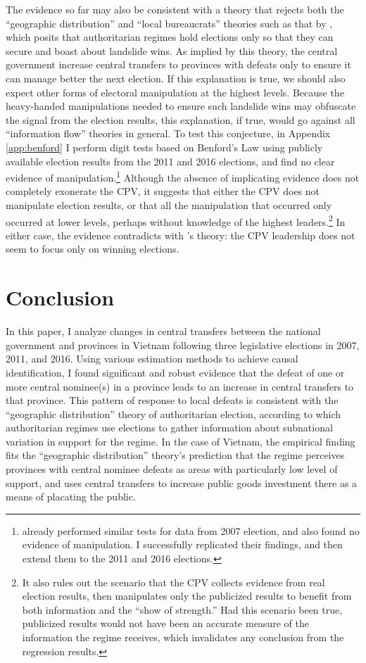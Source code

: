 \documentclass[12pt]{article}\usepackage[]{graphicx}\usepackage[]{color}
\newcommand{\1}{\mathbbm{1}}
\begin{document}
The evidence so far may also be consistent with a theory that rejects both the ``geographic distribution'' and ``local bureaucrats'' theories such as that by \cite{Geddes2005}, which posits that authoritarian regimes hold elections only so that they can secure and boast about landslide wins. As implied by this theory, the central government increase central transfers to provinces with defeats only to ensure it can manage better the next election. If this explanation is true, we should also expect other forms of electoral manipulation at the highest levels. Because the heavy-handed manipulations needed to ensure such landslide wins may obfuscate the signal from the election results, this explanation, if true, would go against all ``information flow'' theories in general.  To test this conjecture, in Appendix \ref{app:benford} I perform digit tests based on Benford's Law using publicly available election results from the 2011 and 2016 elections, and find no clear evidence of manipulation.\footnote{\cite{MaleskySchuler2011} already performed similar tests for data from 2007 election, and also found no evidence of manipulation. I successfully replicated their findings, and then extend them to the 2011 and 2016 elections.} Although the absence of implicating evidence does not completely exonerate the CPV, it suggests that either the CPV does not manipulate election results, or that all the manipulation that occurred only occurred at lower levels, perhaps without knowledge of the highest leaders.\footnote{It also rules out the scenario that the CPV collects evidence from real election results, then manipulates only the publicized results to benefit from both information and the ``show of strength.'' Had this scenario been true, publicized results would not have been an accurate measure of the information the regime receives, which invalidates any conclusion from the regression results.} In either case, the evidence contradicts with \cite{Geddes2005}'s theory: the CPV leadership does not seem to focus only on winning elections.

\section{Conclusion}
\label{sec:conclusion}

In this paper, I analyze changes in central transfers between the national government and provinces in Vietnam following three legislative elections in 2007, 2011, and 2016. Using various estimation methods to achieve causal identification, I found significant and robust evidence that the defeat of one or more central nominee(s) in a province leads to an increase in central transfers to that province. This pattern of response to local defeats is consistent with the ``geographic distribution'' theory of authoritarian election, according to which authoritarian regimes use elections to gather information about subnational variation in support for the regime. In the case of Vietnam, the empirical finding fits the ``geographic distribution'' theory's prediction that the regime perceives provinces with central nominee defeats as areas with particularly low level of support, and uses central transfers to increase public goods investment there as a means of placating the public.
\end{document}
